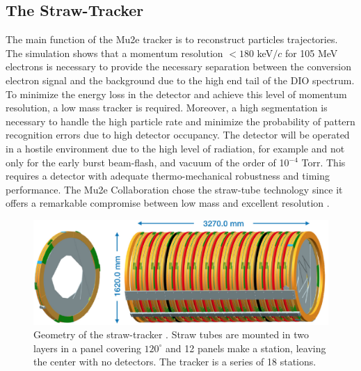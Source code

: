 \documentclass[12pt,a4paper,openright, oneside, titlepage]{book} %
\begin{document}
\subsection{The Straw-Tracker}
The main function of the Mu2e tracker is to reconstruct particles trajectories. 
The simulation shows that a momentum resolution $<180$ keV$/c$ for 105 MeV electrons 
is necessary to provide the necessary separation between the conversion electron signal 
and the background due to the high end tail of the DIO spectrum. 
To minimize the energy loss in the detector and achieve this level of momentum resolution, 
a low mass tracker is required. Moreover, a high segmentation is necessary to 
handle the high particle rate and minimize the probability of pattern recognition errors
due to high detector occupancy.
The detector will be operated in a hostile environment due to the high level of radiation, 
for example and not only for the early burst beam-flash, and vacuum of the order of 10$^{-4}$ Torr.
This requires a detector with adequate thermo-mechanical robustness and timing performance.
The Mu2e Collaboration chose the straw-tube technology 
since it offers a remarkable compromise between low mass 
and excellent resolution \cite{Tracker:2016} \cite{Tracker:2018}.

\begin{figure}[h!]
\centering
\includegraphics[scale=0.5]{Tracker_2}
\caption{Geometry of the straw-tracker \cite{Manolis}. 
Straw tubes are mounted in two layers in a panel covering $120^\circ$ 
and 12 panels make a station, leaving the center with no detectors. The tracker is a series of 18 stations.}
\label{_tracker}
\end{figure}

\end{document}
